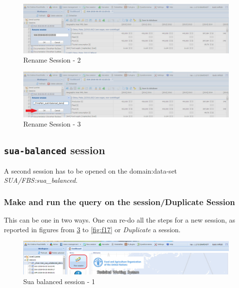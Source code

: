 \documentclass[]{article}
\begin{document}
\begin{figure}[H]

{\centering \includegraphics[width=1\linewidth]{images/standPlugin/12_selectDeleteName} 

}

\caption{\label{fig:f12}Rename Session - 2}\label{fig:f12}
\end{figure}

\begin{figure}[H]

{\centering \includegraphics[width=1\linewidth]{images/standPlugin/13_changeName} 

}

\caption{\label{fig:f13}Rename Session - 3}\label{fig:f13}
\end{figure}

\subsection{\texorpdfstring{\texttt{sua-balanced}
session}{sua-balanced session}}\label{sua-balanced-session}

A second session has to be opened on the domain:data-set
\emph{SUA/FBS:sua\_balanced}.

\subsubsection{Make and run the query on the session/Duplicate
Session}\label{make-and-run-the-query-on-the-sessionduplicate-session}

This can be one in two ways. One can re-do all the steps for a new
session, as reported in figures from \ref{fig:f14} to \ref{fig:f17} or
\emph{Duplicate} a session.

\begin{figure}[H]

{\centering \includegraphics[width=1\linewidth]{images/standPlugin/14_newSession2} 

}

\caption{\label{fig:f14}Sua balanced session - 1}\label{fig:f14}
\end{figure}
\end{document}
